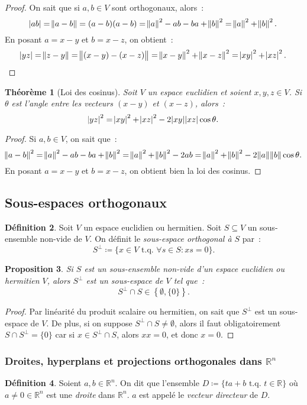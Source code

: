 \documentclass{article}
\newcommand{\R}{\mathbb R}
\newcommand{\tq}{\textrm{ t.q. }}
\newtheorem{thm}{Théorème}[section]
\newtheorem{prp}[thm]{Proposition}
\theoremstyle{definition}
\newtheorem{déf}[thm]{Définition}
\theoremstyle{remark}
\begin{document}
		\begin{proof} On sait que si $a, b \in V$ sont orthogonaux, alors~:
		\[\abs {ab} = \norm {a-b} = (a-b)(a-b) = \norm a^2 - ab - ba + \norm b^2 = \norm a^2 + \norm b^2.\]
		En posant $a = x-y$ et $b = x-z$, on obtient~:
		\[\abs {yz} = \norm{z - y} = \norm{(x-y) - (x-z)} = \norm{x-y}^2 + \norm {x-z}^2 = \abs{xy}^2 + \abs {xz}^2.\]
		\end{proof}

		\begin{thm}[Loi des cosinus] Soit $V$ un espace euclidien et soient $x, y, z \in V$. Si $\theta$ est l'angle entre les vecteurs $(x-y)$ et $(x-z)$,
		alors~:
		\[\abs {yz}^2 = \abs {xy}^2 + \abs {xz}^2 - 2\abs{xy}\abs{xz}\cos\theta.\]
		\end{thm}

		\begin{proof} Si $a, b \in V$, on sait que~:
		\[\norm {a-b}^2 = \norm a^2 - ab - ba + \norm b^2 = \norm a^2 + \norm b^2 - 2ab = \norm a^2 + \norm b^2 - 2\norm a\norm b\cos \theta.\]
		En posant $a = x-y$ et $b = x-z$, on obtient bien la loi des cosinus.
		\end{proof}

	\subsection{Sous-espaces orthogonaux}
		\begin{déf} Soit $V$ un espace euclidien ou hermitien. Soit $S \subseteq V$ un sous-ensemble non-vide de $V$. On définit le \emph{sous-espace orthogonal
		à $S$} par~:
		\[S^\bot \coloneqq \{x \in V \tq \forall s \in S : xs = 0\}.\]
		\end{déf}

		\begin{prp} Si $S$ est un sous-ensemble non-vide d'un espace euclidien ou hermitien $V$, alors $S^\bot$ est un sous-espace de $V$ tel que~:
		\[S^\bot \cap S\in \left\{\emptyset, \{0\}\right\}.\]
		\end{prp}

		\begin{proof} Par linéarité du produit scalaire ou hermitien, on sait que $S^\bot$ est un sous-espace de $V$. De plus, si on suppose
		$S^\bot \cap S \neq \emptyset$, alors il faut obligatoirement $S \cap S^\bot = \{0\}$ car si $x \in S^\bot \cap S$, alors $xx = 0$, et donc $x = 0$.
		\end{proof}

		\subsubsection{Droites, hyperplans et projections orthogonales dans $\R^n$}
		\begin{déf} Soient $a, b \in \R^n$. On dit que l'ensemble $D \coloneqq \{ta + b \tq t \in \R\}$ où $a \neq 0 \in \R^n$ est une \emph{droite} dans $\R^n$.
		$a$ est appelé le \emph{vecteur directeur} de $D$.
		\end{déf}
\end{document}
